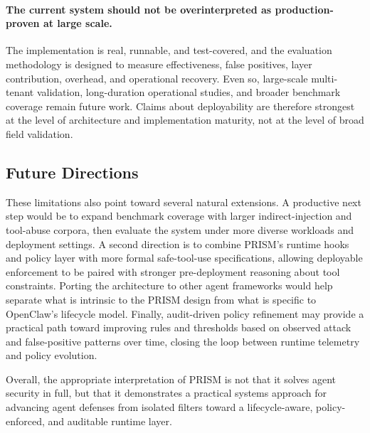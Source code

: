 \paragraph{The current system should not be overinterpreted as production-proven at large scale.} The implementation is real, runnable, and test-covered, and the evaluation methodology is designed to measure effectiveness, false positives, layer contribution, overhead, and operational recovery. Even so, large-scale multi-tenant validation, long-duration operational studies, and broader benchmark coverage remain future work. Claims about deployability are therefore strongest at the level of architecture and implementation maturity, not at the level of broad field validation.

\subsection{Future Directions}

These limitations also point toward several natural extensions. A productive next step would be to expand benchmark coverage with larger indirect-injection and tool-abuse corpora, then evaluate the system under more diverse workloads and deployment settings. A second direction is to combine PRISM's runtime hooks and policy layer with more formal safe-tool-use specifications, allowing deployable enforcement to be paired with stronger pre-deployment reasoning about tool constraints. Porting the architecture to other agent frameworks would help separate what is intrinsic to the PRISM design from what is specific to OpenClaw's lifecycle model. Finally, audit-driven policy refinement may provide a practical path toward improving rules and thresholds based on observed attack and false-positive patterns over time, closing the loop between runtime telemetry and policy evolution.

Overall, the appropriate interpretation of PRISM is not that it solves agent security in full, but that it demonstrates a practical systems approach for advancing agent defenses from isolated filters toward a lifecycle-aware, policy-enforced, and auditable runtime layer.
